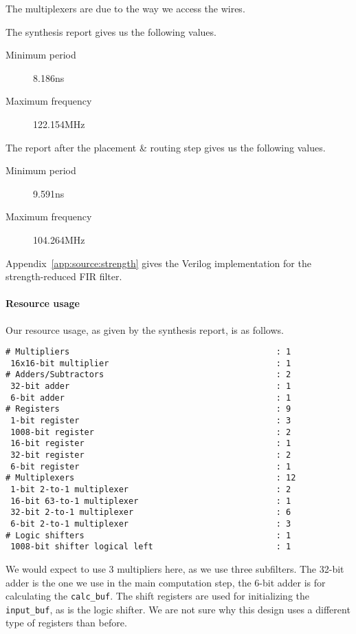 The multiplexers are due to the way we access the wires.

The synthesis report gives us the following values.
\begin{description}
	\item[Minimum period] 8.186ns
	\item[Maximum frequency] 122.154MHz
\end{description}

The report after the placement \& routing step gives us the following values.
\begin{description}
	\item[Minimum period] 9.591ns
	\item[Maximum frequency] 104.264MHz
\end{description}

\strengthfilter
Appendix~\ref{app:source:strength} gives the Verilog implementation for the strength-reduced FIR filter.

\paragraph{Resource usage}
Our resource usage, as given by the synthesis report, is as follows.

\begin{verbatim}
# Multipliers                                          : 1
 16x16-bit multiplier                                  : 1
# Adders/Subtractors                                   : 2
 32-bit adder                                          : 1
 6-bit adder                                           : 1
# Registers                                            : 9
 1-bit register                                        : 3
 1008-bit register                                     : 2
 16-bit register                                       : 1
 32-bit register                                       : 2
 6-bit register                                        : 1
# Multiplexers                                         : 12
 1-bit 2-to-1 multiplexer                              : 2
 16-bit 63-to-1 multiplexer                            : 1
 32-bit 2-to-1 multiplexer                             : 6
 6-bit 2-to-1 multiplexer                              : 3
# Logic shifters                                       : 1
 1008-bit shifter logical left                         : 1
\end{verbatim}

We would expect to use 3 multipliers here, as we use three subfilters.
The 32-bit adder is the one we use in the main computation step, the 6-bit adder is for calculating the \texttt{calc\_buf}.
The shift registers are used for initializing the \texttt{input\_buf}, as is the logic shifter.
We are not sure why this design uses a different type of registers than before.

